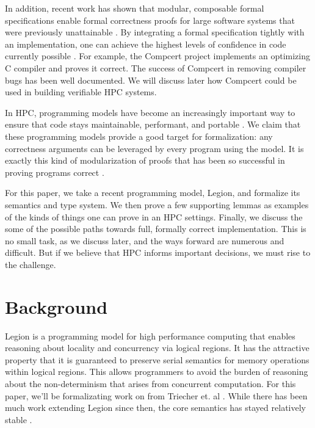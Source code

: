 \documentclass[sigconf]{acmart}
\begin{document}
In addition, recent work has shown that modular, composable formal
specifications enable formal correctness proofs for large software systems that
were previously unattainable \cite{weng2016deepspec}. By integrating a formal specification
tightly with an implementation, one can achieve the highest levels of
confidence in code currently possible \cite{weng2016deepspec}. For example, the Compcert
project implements an optimizing C compiler and proves it correct. The success
of Compcert in removing compiler bugs has been well documented. We will discuss
later how Compcert could be used in building verifiable HPC systems.

In HPC, programming models have become an increasingly important way to ensure
that code stays maintainable, performant, and portable \cite{diaz2012survey}. We claim that
these programming models provide a good target for formalization: any
correctness arguments can be leveraged by every program using the model. It is
exactly this kind of modularization of proofs that has been so successful in
proving programs correct \cite{weng2016deepspec}.

For this paper, we take a recent programming model, Legion, and formalize its
semantics and type system. We then prove a few supporting lemmas as examples of
the kinds of things one can prove in an HPC settings. Finally, we discuss the
some of the possible paths towards full, formally correct implementation. This
is no small task, as we discuss later, and the ways forward are numerous and
difficult. But if we believe that HPC informs important decisions, we must
rise to the challenge.

\section{Background}

Legion is a programming model for high performance computing that enables
reasoning about locality and concurrency via logical regions. It has the
attractive property that it is guaranteed to preserve serial semantics for
memory operations within logical regions. This allows programmers to avoid the
burden of reasoning about the non-determinism that arises from concurrent
computation. For this paper, we'll be formalizating work on from Triecher et.
al \cite{treichler2013language}. While there has been much work extending Legion since then,
the core semantics has stayed relatively stable \cite{slaughter2015regent, deppart}. 
\end{document}
